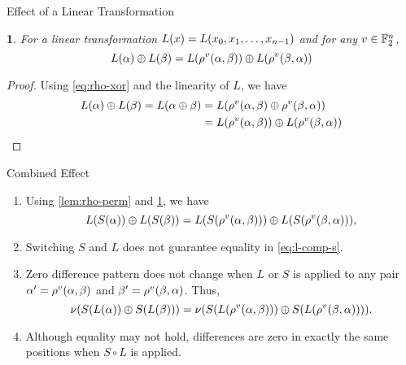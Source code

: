 \documentclass[notheorems]{beamer}
\newtheorem{lemma}{\translate{Lemma}}
\theoremstyle{definition}
\theoremstyle{example}
\begin{document}
    \begin{frame}{Effect of a Linear Transformation}
        \begin{lemma}
            \label{lem:rho-lin}
            For a linear transformation \(L(x) = L(x_0, x_1, \ldots,
            x_{n - 1})\) and for any \(v \in \mathbb F_2^n\),
            \begin{equation}
                L(\alpha) \oplus L(\beta) = L(\rho^v(\alpha, \beta)) \oplus L(\rho^v(\beta, \alpha))
            \end{equation}
        \end{lemma}
        \pause
        \begin{proof}
            Using \eqref{eq:rho-xor} and the linearity of \(L\), we have
            \begin{align}
                L(\alpha) \oplus L(\beta) = L(\alpha \oplus \beta) &= L(\rho^v(\alpha, \beta) \oplus \rho^v(\beta, \alpha)) \\
                &= L(\rho^v(\alpha, \beta)) \oplus L(\rho^v(\beta, \alpha))
            \end{align}
        \end{proof}
    \end{frame}

    \begin{frame}{Combined Effect}
        \begin{enumerate}
            \item<1-> Using \cref{lem:rho-perm} and \cref{lem:rho-lin}, we have
            \begin{equation}
                L(S(\alpha)) \oplus L(S(\beta)) = L(S(\rho^v(\alpha, \beta))) \oplus L(S(\rho^v(\beta, \alpha))),
                \label{eq:l-comp-s}
            \end{equation}
            \item<2-> Switching \(S\) and \(L\) does not guarantee equality in
            \eqref{eq:l-comp-s}.
            \item<3-> Zero difference pattern does not change when \(L\) or
            \(S\) is applied to any pair \(\alpha^\prime = \rho^v(\alpha,
            \beta)\) and \(\beta^\prime = \rho^v(\beta, \alpha)\). Thus,
            \begin{equation}
                \nu(S(L(\alpha)) \oplus S(L(\beta))) = \nu(S(L(\rho^v(\alpha, \beta))) \oplus S(L(\rho^v(\beta, \alpha)))).
                \label{eq:nu-s-comp-l}
            \end{equation}
            \item<4-> Although equality may not hold, differences are zero in
            exactly the same positions when \(S \circ L\) is applied.
        \end{enumerate}
    \end{frame}
\end{document}
